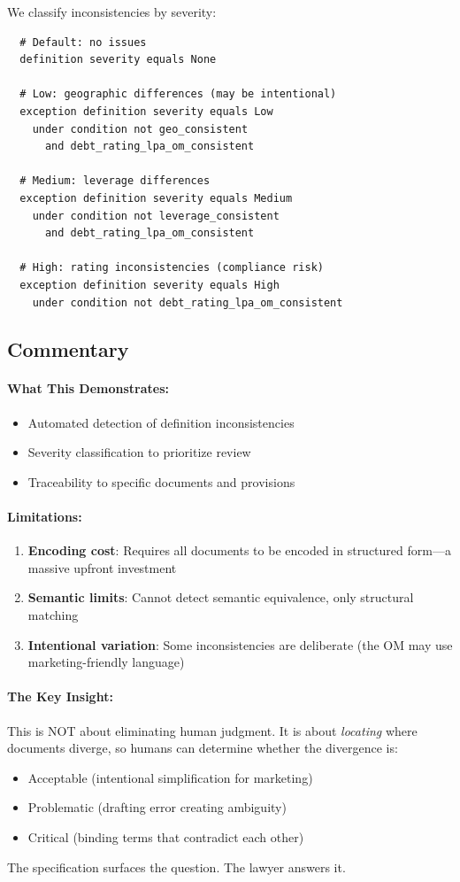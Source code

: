 We classify inconsistencies by severity:

\begin{lstlisting}
  # Default: no issues
  definition severity equals None

  # Low: geographic differences (may be intentional)
  exception definition severity equals Low
    under condition not geo_consistent
      and debt_rating_lpa_om_consistent

  # Medium: leverage differences
  exception definition severity equals Medium
    under condition not leverage_consistent
      and debt_rating_lpa_om_consistent

  # High: rating inconsistencies (compliance risk)
  exception definition severity equals High
    under condition not debt_rating_lpa_om_consistent
\end{lstlisting}

\subsection{Commentary}
\label{sec:crossref-commentary}

\paragraph{What This Demonstrates:}
\begin{itemize}
  \item Automated detection of definition inconsistencies
  \item Severity classification to prioritize review
  \item Traceability to specific documents and provisions
\end{itemize}

\paragraph{Limitations:}
\begin{enumerate}
  \item \textbf{Encoding cost}: Requires all documents to be encoded in structured form---a massive upfront investment
  \item \textbf{Semantic limits}: Cannot detect semantic equivalence, only structural matching
  \item \textbf{Intentional variation}: Some inconsistencies are deliberate (the OM may use marketing-friendly language)
\end{enumerate}

\paragraph{The Key Insight:} This is NOT about eliminating human judgment. It is about \textit{locating} where documents diverge, so humans can determine whether the divergence is:
\begin{itemize}
  \item Acceptable (intentional simplification for marketing)
  \item Problematic (drafting error creating ambiguity)
  \item Critical (binding terms that contradict each other)
\end{itemize}

The specification surfaces the question. The lawyer answers it.
